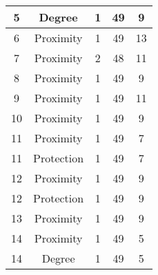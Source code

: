 \documentclass[results.tex]{subfiles}
\begin{document}
\begin{center}
\begin{tabular}{| c || c | c | c | c |}
            \hline
            5                       & Degree                       & 1                      & 49                      & 9                    \\
            \hline
            6                       & Proximity                    & 1                      & 49                      & 13                   \\
            \hline
            7                       & Proximity                    & 2                      & 48                      & 11                   \\
            \hline
            8                       & Proximity                    & 1                      & 49                      & 9                    \\
            \hline
            9                       & Proximity                    & 1                      & 49                      & 11                   \\
            \hline
            10                      & Proximity                    & 1                      & 49                      & 9                    \\
            \hline
            11                      & Proximity                    & 1                      & 49                      & 7                    \\
            \hline
            11                      & Protection                   & 1                      & 49                      & 7                    \\
            \hline
            12                      & Proximity                    & 1                      & 49                      & 9                    \\
            \hline
            12                      & Protection                   & 1                      & 49                      & 9                    \\
            \hline
            13                      & Proximity                    & 1                      & 49                      & 9                    \\
            \hline
            14                      & Proximity                    & 1                      & 49                      & 5                    \\
            \hline
            14                      & Degree                       & 1                      & 49                      & 5                    \\

\end{tabular}
\end{center}
\end{document}
